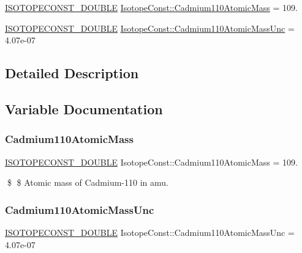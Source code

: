 \begin{DoxyCompactItemize}
\item 
\mbox{\hyperlink{group___isotope_const-_macros_ga8f45a7272ce02c0b4c65c44636ed719a}{I\+S\+O\+T\+O\+P\+E\+C\+O\+N\+S\+T\+\_\+\+D\+O\+U\+B\+LE}} \mbox{\hyperlink{group___isotope_const-_cadmium-_cd110_ga15de92e6dc064b729247683bfa553fa6}{Isotope\+Const\+::\+Cadmium110\+Atomic\+Mass}} = 109.
\item 
\mbox{\hyperlink{group___isotope_const-_macros_ga8f45a7272ce02c0b4c65c44636ed719a}{I\+S\+O\+T\+O\+P\+E\+C\+O\+N\+S\+T\+\_\+\+D\+O\+U\+B\+LE}} \mbox{\hyperlink{group___isotope_const-_cadmium-_cd110_gaf4c78b77e2711a4a803dba3f03f80f80}{Isotope\+Const\+::\+Cadmium110\+Atomic\+Mass\+Unc}} = 4.\+07e-\/07
\end{DoxyCompactItemize}


\subsection{Detailed Description}


\subsection{Variable Documentation}
\mbox{\label{group___isotope_const-_cadmium-_cd110_ga15de92e6dc064b729247683bfa553fa6}} 
\subsubsection{\texorpdfstring{Cadmium110\+Atomic\+Mass}{Cadmium110AtomicMass}}
{\footnotesize\ttfamily \mbox{\hyperlink{group___isotope_const-_macros_ga8f45a7272ce02c0b4c65c44636ed719a}{I\+S\+O\+T\+O\+P\+E\+C\+O\+N\+S\+T\+\_\+\+D\+O\+U\+B\+LE}} Isotope\+Const\+::\+Cadmium110\+Atomic\+Mass = 109.}

\$ \$ Atomic mass of Cadmium-\/110 in amu. \mbox{\label{group___isotope_const-_cadmium-_cd110_gaf4c78b77e2711a4a803dba3f03f80f80}} 
\subsubsection{\texorpdfstring{Cadmium110\+Atomic\+Mass\+Unc}{Cadmium110AtomicMassUnc}}
{\footnotesize\ttfamily \mbox{\hyperlink{group___isotope_const-_macros_ga8f45a7272ce02c0b4c65c44636ed719a}{I\+S\+O\+T\+O\+P\+E\+C\+O\+N\+S\+T\+\_\+\+D\+O\+U\+B\+LE}} Isotope\+Const\+::\+Cadmium110\+Atomic\+Mass\+Unc = 4.\+07e-\/07}

